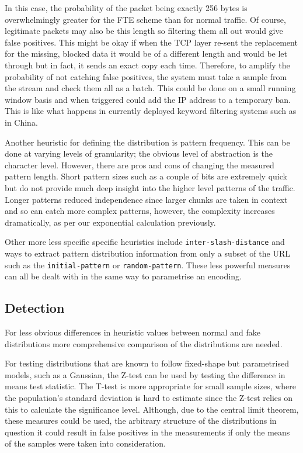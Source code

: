 \documentclass[ %
                    author={Samuel Russell},
                supervisor={Prof. Bogdan Warinschi},
                    degree={MEng},
                     title={Innocuous Ciphertexts},
                  subtitle={The DE-CENSOR Scheme},
                      type={Research},
                      year={2018} ]{dissertation}
\begin{document}
In this case, the probability of the packet being exactly 256 bytes is overwhelmingly greater for the FTE scheme than for normal traffic.
Of course, legitimate packets may also be this length so filtering them all out would give false positives.
This might be okay if when the TCP layer re-sent the replacement for the missing, blocked data it would be of a different length and would be let through but in fact, it sends an exact copy each time.
Therefore, to amplify the probability of not catching false positives, the system must take a sample from the stream and check them all as a batch.
This could be done on a small running window basis and when triggered could add the IP address to a temporary ban.
This is like what happens in currently deployed keyword filtering systems such as in China.

Another heuristic for defining the distribution is pattern frequency.
This can be done at varying levels of granularity; the obvious level of abstraction is the character level. However, there are pros and cons of changing the measured pattern length.
Short pattern sizes such as a couple of bits are extremely quick but do not provide much deep insight into the higher level patterns of the traffic.
Longer patterns reduced independence since larger chunks are taken in context and so can catch more complex patterns, however, the complexity increases dramatically, as per our exponential calculation previously.

Other more less specific specific heuristics include \texttt{inter-slash-distance} and ways to extract pattern distribution information from only a subset of the URL such as the \texttt{initial-pattern} or \texttt{random-pattern}. These less powerful measures can all be dealt with in the same way to parametrise an encoding.

\subsection{Detection}

For less obvious differences in heuristic values between normal and fake distributions more comprehensive comparison of the distributions are needed.

For testing distributions that are known to follow fixed-shape but parametrised models, such as a Gaussian, the Z-test can be used by testing the difference in means test statistic.
The T-test is more appropriate for small sample sizes, where the population's standard deviation is hard to estimate since the Z-test relies on this to calculate the significance level.
Although, due to the central limit theorem, these measures could be used, the arbitrary structure of the distributions in question it could result in false positives in the measurements if only the means of the samples were taken into consideration.
\end{document}
